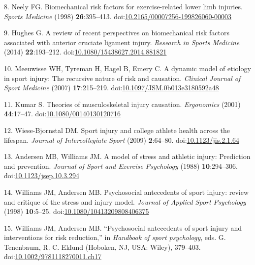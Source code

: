 \documentclass[
  english,
  man]{apa6}
\newenvironment{cslreferences}%
  {}%
  {\par}
\begin{document}
\begin{cslreferences}
\leavevmode\hypertarget{ref-Neely1998}{}%
8. Neely FG. Biomechanical risk factors for exercise-related lower limb injuries. \emph{Sports Medicine} (1998) \textbf{26}:395--413. doi:\href{https://doi.org/10.2165/00007256-199826060-00003}{10.2165/00007256-199826060-00003}

\leavevmode\hypertarget{ref-Hughes2014}{}%
9. Hughes G. A review of recent perspectives on biomechanical risk factors associated with anterior cruciate ligament injury. \emph{Research in Sports Medicine} (2014) \textbf{22}:193--212. doi:\href{https://doi.org/10.1080/15438627.2014.881821}{10.1080/15438627.2014.881821}

\leavevmode\hypertarget{ref-Meeuwisse2007}{}%
10. Meeuwisse WH, Tyreman H, Hagel B, Emery C. A dynamic model of etiology in sport injury: The recursive nature of risk and causation. \emph{Clinical Journal of Sport Medicine} (2007) \textbf{17}:215--219. doi:\href{https://doi.org/10.1097/JSM.0b013e3180592a48}{10.1097/JSM.0b013e3180592a48}

\leavevmode\hypertarget{ref-Kumar2001}{}%
11. Kumar S. Theories of musculoskeletal injury causation. \emph{Ergonomics} (2001) \textbf{44}:17--47. doi:\href{https://doi.org/10.1080/00140130120716}{10.1080/00140130120716}

\leavevmode\hypertarget{ref-Wiese-Bjornstal2009}{}%
12. Wiese-Bjornstal DM. Sport injury and college athlete health across the lifespan. \emph{Journal of Intercollegiate Sport} (2009) \textbf{2}:64--80. doi:\href{https://doi.org/10.1123/jis.2.1.64}{10.1123/jis.2.1.64}

\leavevmode\hypertarget{ref-Andersen1988}{}%
13. Andersen MB, Williams JM. A model of stress and athletic injury: Prediction and prevention. \emph{Journal of Sport and Exercise Psychology} (1988) \textbf{10}:294--306. doi:\href{https://doi.org/10.1123/jsep.10.3.294}{10.1123/jsep.10.3.294}

\leavevmode\hypertarget{ref-Williams1998}{}%
14. Williams JM, Andersen MB. Psychosocial antecedents of sport injury: review and critique of the stress and injury model. \emph{Journal of Applied Sport Psychology} (1998) \textbf{10}:5--25. doi:\href{https://doi.org/10.1080/10413209808406375}{10.1080/10413209808406375}

\leavevmode\hypertarget{ref-Williams2007}{}%
15. Williams JM, Andersen MB. ``Psychosocial antecedents of sport injury and interventions for risk reduction,'' in \emph{Handbook of sport psychology}, eds. G. Tenenbaum, R. C. Eklund (Hoboken, NJ, USA: Wiley), 379--403. doi:\href{https://doi.org/10.1002/9781118270011.ch17}{10.1002/9781118270011.ch17}


\end{cslreferences}
\end{document}
